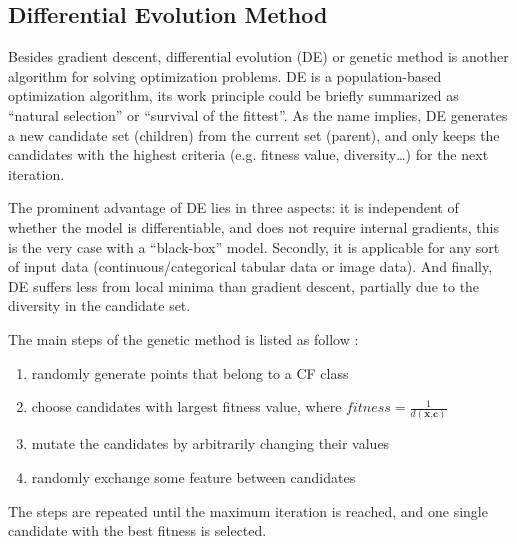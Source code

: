 \subsection{Differential Evolution Method}
Besides gradient descent, differential evolution (DE) or genetic method is another algorithm for solving optimization problems. DE is a population-based optimization algorithm, its work principle could be briefly summarized as ``natural selection'' or ``survival of the fittest''. As the name implies, DE generates a new candidate set (children) from the current set (parent), and only keeps the candidates with the highest criteria (e.g. fitness value, diversity\dots) for the next iteration.

The prominent advantage of DE lies in three aspects: it is independent of whether the model is differentiable, and does not require internal gradients, this is the very case with a ``black-box'' model. Secondly, it is applicable for any sort of input data (continuous/categorical tabular data or image data). And finally, DE suffers less from local minima than gradient descent, partially due to the diversity in the candidate set.

The main steps of the genetic method is listed as follow \cite{certifai}:
\begin{enumerate}
  \item randomly generate points that belong to a CF class
  \item choose candidates with largest fitness value, where $fitness=\frac{1}{d(\textbf{x,c})}$
  \item mutate the candidates by arbitrarily changing their values
  \item randomly exchange some feature between candidates
\end{enumerate}
The steps are repeated until the maximum iteration is reached, and one single candidate with the best fitness is selected.

